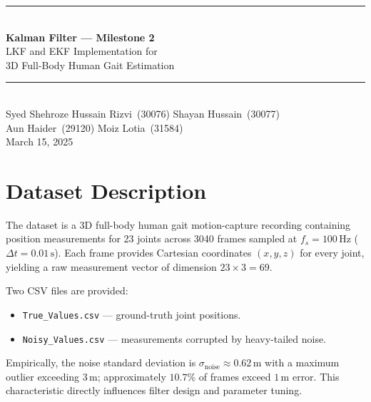 \documentclass[11pt, a4paper]{article}
\begin{document}
\begin{center}
  \vspace*{0.4cm}
  {\color{navyblue}\rule{\linewidth}{1.2pt}}\\[10pt]
  {\LARGE\bfseries Kalman Filter — Milestone 2}\\[8pt]
  {\large LKF and EKF Implementation for\\[4pt]
   3D Full-Body Human Gait Estimation}\\[10pt]
  {\color{navyblue}\rule{\linewidth}{0.6pt}}\\[14pt]
  {\normalsize
    Syed Shehroze Hussain Rizvi\ (30076)\quad
    Shayan Hussain\ (30077)\\[4pt]
    Aun Haider\ (29120)\quad
    Moiz Lotia\ (31584)
  }\\[8pt]
  {\small March 15, 2025}\\[16pt]
\end{center}

\tableofcontents
\newpage

\section{Dataset Description}

The dataset is a 3D full-body human gait motion-capture recording containing position
measurements for 23 joints across 3040 frames sampled at $f_s = 100\,\text{Hz}$
($\Delta t = 0.01\,\text{s}$). Each frame provides Cartesian coordinates $(x,y,z)$ for
every joint, yielding a raw measurement vector of dimension $23 \times 3 = 69$.

Two CSV files are provided:
\begin{itemize}
  \item \texttt{True\_Values.csv} --- ground-truth joint positions.
  \item \texttt{Noisy\_Values.csv} --- measurements corrupted by heavy-tailed noise.
\end{itemize}

Empirically, the noise standard deviation is $\sigma_\text{noise} \approx 0.62\,\text{m}$
with a maximum outlier exceeding $3\,\text{m}$; approximately $10.7\%$ of frames
exceed $1\,\text{m}$ error. This characteristic directly influences filter design and
parameter tuning.
\end{document}
